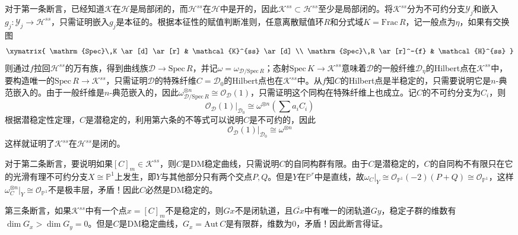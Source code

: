 对于第一条断言，已经知道$ \mathcal{K} $在$ \mathcal{H} $是局部闭的，而$ \mathcal{H}^{ss} $在$ \mathcal{H} $中是开的，因此$ \mathcal{K}^{ss}\subset \mathcal{H}^{ss} $至少是局部闭的。将$ \mathcal{K}^{ss} $分为不可约分支$ \mathcal{Y}_j $和嵌入$ g_j:\mathcal{Y}_j\to \mathcal{H}^{ss} $，只需证明嵌入$ g_j $是本征的。根据本征性的赋值判断准则，任意离散赋值环$ R $和分式域$ K=\mathrm{Frac}\,R $，记一般点为$ \eta $，如果有交换图
$$ \xymatrix{
	\mathrm{Spec}\,K \ar[d] \ar[r] & \mathcal{K}^{ss} \ar[d] \\
	\mathrm{Spec}\,R \ar[r]^-{f} & \mathcal{H}^{ss}
} $$
则通过$ f $拉回$ \mathcal{H}^{ss} $的万有族，得到曲线族$ \mathcal{D}\to \mathrm{Spec}\,R $，并记$ \omega=\omega_{\mathcal{D}/\mathrm{Spec}\,R} $；态射$ \mathrm{Spec}\,K \to \mathcal{K}^{ss} $意味着$ \mathcal{D} $的一般纤维$ \mathcal{D}_{\eta} $的Hilbert点在$ \mathcal{K}^{ss} $中，要构造唯一的$ \mathrm{Spec}\,R \to \mathcal{K}^{ss} $，只需证明$ \mathcal{D} $的特殊纤维$ C=\mathcal{D}_0 $的Hilbert点也在$ \mathcal{K}^{ss} $中。从$ f $知$ C $的Hilbert点是半稳定的，只需要说明它是$ n $-典范嵌入的。由于一般纤维是$ n $-典范嵌入的，因此$ \omega_{\mathcal{D}/\mathrm{Spec}\,R}^{\otimes n}\cong \mathscr{O}_{\mathcal{D}}(1) $，只需证明这个同构在特殊纤维上也成立。记$ C $的不可约分支为$ C_i $，则
$$ \mathscr{O}_{\mathcal{D}}(1)|_{\mathcal{D}_0}\cong \omega^{\otimes n}(\sum a_iC_i) $$
根据潜稳定性定理，$ C $是潜稳定的，利用第六条的不等式可以说明$ C $是不可约的，因此$$ \mathscr{O}_{\mathcal{D}}(1)|_{\mathcal{D}_0}\cong \omega^{\otimes n} $$
这样就证明了$ \mathcal{K}^{ss} $在$ \mathcal{H}^{ss} $是闭的。

对于第二条断言，要说明如果$ [C]_m\in\mathcal{K}^{ss} $，则$ C $是DM稳定曲线，只需说明$ C $的自同构群有限。由于$ C $是潜稳定的，$ C $的自同构不有限只在它的光滑有理不可约分支$ X\cong \mathbb{P}^1 $上发生，即$ Y $与其他部分只有两个交点$ P,Q $。但是$ Y $在$ \mathbb{P}^r $中是直线，故$ \omega_C|_{Y}\cong \mathscr{O}_{\mathbb{P}^1}(-2)(P+Q)\cong \mathscr{O}_{\mathbb{P}^1} $，这样$ \omega_C^{\otimes n}|_{Y}\cong \mathscr{O}_{\mathbb{P}^1} $不是极丰层，矛盾！因此$ C $必然是DM稳定的。

第三条断言，如果$ \mathcal{K}^{ss} $中有一个点$ x=[C]_m $不是稳定的，则$ Gx $不是闭轨道，且$ \overline{Gx} $中有唯一的闭轨道$ Gy $，稳定子群的维数有$ \dim G_x>\dim G_y=0 $。但是$ C $是DM稳定曲线，$ G_x=\mathrm{Aut}\, C $是有限群，维数为$ 0 $，矛盾！因此断言得证。

